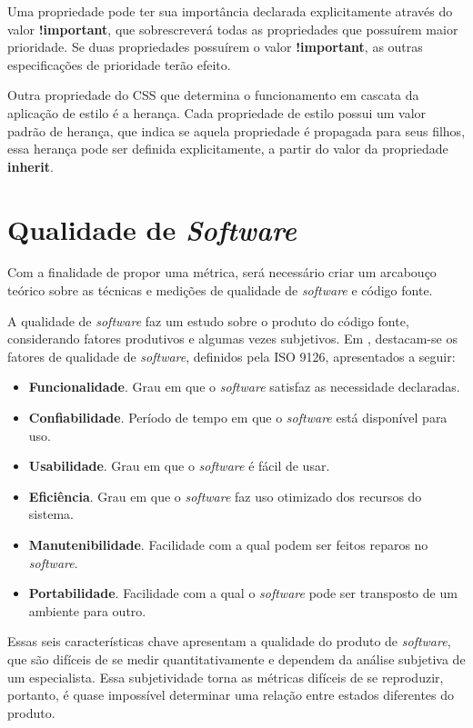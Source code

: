 Uma propriedade pode ter sua importância declarada explicitamente através do valor \textbf{!important}, que sobrescreverá todas as propriedades que possuírem maior prioridade. Se duas propriedades possuírem o valor \textbf{!important}, as outras especificações de prioridade terão efeito.

Outra propriedade do CSS que determina o funcionamento em cascata da aplicação de estilo é a herança. Cada propriedade de estilo possui um valor padrão de herança, que indica se aquela propriedade é propagada para seus filhos, essa herança pode ser definida explicitamente, a partir do valor da propriedade \textbf{inherit}. 

\section{Qualidade de \textit{Software}}

Com a finalidade de propor uma métrica, será necessário criar um arcabouço teórico sobre as técnicas e medições de qualidade de \textit{software} e código fonte.

A qualidade de \textit{software} faz um estudo sobre o produto do código fonte, considerando fatores produtivos e algumas vezes subjetivos. Em , destacam-se os fatores de qualidade de \textit{software}, definidos pela ISO 9126, apresentados a seguir:

\begin{itemize}
	\item \textbf{Funcionalidade}. Grau em que o \textit{software} satisfaz as necessidade declaradas.
	\item \textbf{Confiabilidade}. Período de tempo em que o \textit{software} está disponível para uso.
	\item \textbf{Usabilidade}. Grau em que o \textit{software} é fácil de usar.
	\item \textbf{Eficiência}. Grau em que o \textit{software} faz uso otimizado dos recursos do sistema.
	\item \textbf{Manutenibilidade}. Facilidade com a qual podem ser feitos reparos no \textit{software}.
	\item \textbf{Portabilidade}. Facilidade com a qual o \textit{software} pode ser transposto de um ambiente para outro.
\end{itemize}

Essas seis características chave apresentam a qualidade do produto de \textit{software}, que são difíceis de se medir quantitativamente e dependem da análise subjetiva de um especialista. Essa subjetividade torna as métricas difíceis de se reproduzir, portanto, é quase impossível determinar uma relação entre estados diferentes do produto.


